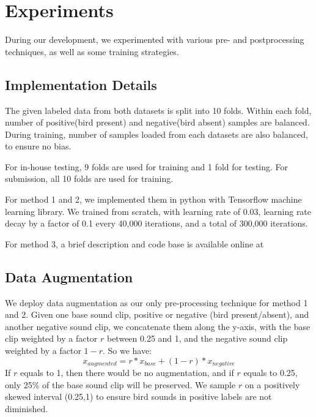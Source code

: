 \documentclass[10pt,twocolumn,letterpaper]{article}
\begin{document}
\section{Experiments}

During our development, we experimented with various pre- and
postprocessing techniques, as well as some training strategies.

\subsection{Implementation Details}

The given labeled data from both datasets is split into 10 folds. Within
each fold, number of positive(bird present) and negative(bird absent)
samples are balanced. During training, number of samples loaded from each
datasets are also balanced, to ensure no bias.

For in-house testing, 9 folds are used for training and 1 fold for testing.
For submission, all 10 folds are used for training.

For method 1 and 2, we implemented them in python with Tensorflow machine
learning library. We trained from scratch, with learning rate of 0.03,
learning rate decay by a factor of 0.1 every 40,000 iterations, and a total
of 300,000 iterations.

For method 3, a brief description and code base is available online
at\cite{winning_blog}


\subsection{Data Augmentation}

We deploy data augmentation as our only pre-processing technique for method
1 and 2. Given one base sound clip, positive or negative (bird
present/absent), and another negative sound clip, we concatenate them along
the y-axis, with the base clip weighted by a factor \(r\) between 0.25 and
1, and the negative sound clip weighted by a factor \(1-r\). So we have:
\begin{equation}
	x_{augmented}=r*x_{base} + (1-r)*x_{negative}
\end{equation}
If \(r\) equals to 1, then there would be no augmentation, and if \(r\)
equals to 0.25, only 25\% of the base sound clip will be preserved. We
sample \(r\) on a positively skewed interval (0.25,1) to ensure bird sounds
in positive labels are not diminished.
\end{document}
